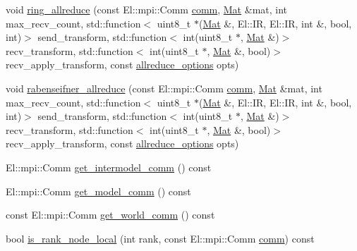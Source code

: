 \begin{DoxyCompactItemize}
\item 
void \hyperlink{classlbann_1_1lbann__comm_a88162511dc2733dccd9c245e6c7ba53b}{ring\+\_\+allreduce} (const El\+::mpi\+::\+Comm \hyperlink{file__io_8cpp_ab048c6f9fcbcfaa57ce68b00263dbebe}{comm}, \hyperlink{base_8hpp_a68f11fdc31b62516cb310831bbe54d73}{Mat} \&mat, int max\+\_\+recv\+\_\+count, std\+::function$<$ uint8\+\_\+t $\ast$(\hyperlink{base_8hpp_a68f11fdc31b62516cb310831bbe54d73}{Mat} \&, El\+::\+IR, El\+::\+IR, int \&, bool, int)$>$ send\+\_\+transform, std\+::function$<$ int(uint8\+\_\+t $\ast$, \hyperlink{base_8hpp_a68f11fdc31b62516cb310831bbe54d73}{Mat} \&)$>$ recv\+\_\+transform, std\+::function$<$ int(uint8\+\_\+t $\ast$, \hyperlink{base_8hpp_a68f11fdc31b62516cb310831bbe54d73}{Mat} \&, bool)$>$ recv\+\_\+apply\+\_\+transform, const \hyperlink{structlbann_1_1lbann__comm_1_1allreduce__options}{allreduce\+\_\+options} opts)
\item 
void \hyperlink{classlbann_1_1lbann__comm_a925fcf1c15cb8ff10daed1dc1faed9ac}{rabenseifner\+\_\+allreduce} (const El\+::mpi\+::\+Comm \hyperlink{file__io_8cpp_ab048c6f9fcbcfaa57ce68b00263dbebe}{comm}, \hyperlink{base_8hpp_a68f11fdc31b62516cb310831bbe54d73}{Mat} \&mat, int max\+\_\+recv\+\_\+count, std\+::function$<$ uint8\+\_\+t $\ast$(\hyperlink{base_8hpp_a68f11fdc31b62516cb310831bbe54d73}{Mat} \&, El\+::\+IR, El\+::\+IR, int \&, bool, int)$>$ send\+\_\+transform, std\+::function$<$ int(uint8\+\_\+t $\ast$, \hyperlink{base_8hpp_a68f11fdc31b62516cb310831bbe54d73}{Mat} \&)$>$ recv\+\_\+transform, std\+::function$<$ int(uint8\+\_\+t $\ast$, \hyperlink{base_8hpp_a68f11fdc31b62516cb310831bbe54d73}{Mat} \&, bool)$>$ recv\+\_\+apply\+\_\+transform, const \hyperlink{structlbann_1_1lbann__comm_1_1allreduce__options}{allreduce\+\_\+options} opts)
\item 
El\+::mpi\+::\+Comm \hyperlink{classlbann_1_1lbann__comm_a61d59b7dff63ece4c10cd3946b41cb39}{get\+\_\+intermodel\+\_\+comm} () const
\item 
El\+::mpi\+::\+Comm \hyperlink{classlbann_1_1lbann__comm_acc06dd4de92e45030d6fbe5984ae58d1}{get\+\_\+model\+\_\+comm} () const
\item 
const El\+::mpi\+::\+Comm \hyperlink{classlbann_1_1lbann__comm_a0493f1f0c42b95674daacf5288fdb073}{get\+\_\+world\+\_\+comm} () const
\item 
bool \hyperlink{classlbann_1_1lbann__comm_a5cdd318d1505ba0f31bf4fe9fadffacc}{is\+\_\+rank\+\_\+node\+\_\+local} (int rank, const El\+::mpi\+::\+Comm \hyperlink{file__io_8cpp_ab048c6f9fcbcfaa57ce68b00263dbebe}{comm}) const
\end{DoxyCompactItemize}
